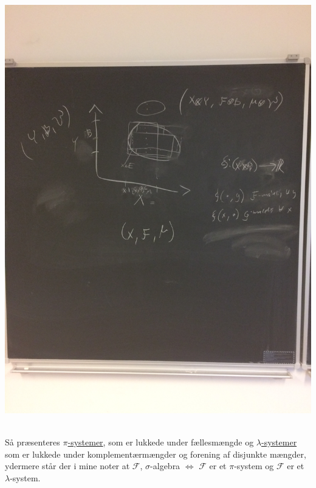 \documentclass[12pt]{report}
\theoremstyle{break}
\theoremstyle{break}
\newcommand{\FI}{\mathcal{F}}
\newcommand{\1}{\mathds{1}}
\begin{document}
\begin{minipage}[c]{\linewidth}
	\centering
	\includegraphics[scale=0.15,angle=270]{IMG_1}\label{fig:prodspace}
\end{minipage}\\[0.7 em]

Så præsenteres \href{https://en.wikipedia.org/wiki/Pi_system}{$\pi$-systemer}, som er lukkede under fællesmængde og \href{https://en.wikipedia.org/wiki/Dynkin_system}{$\lambda$-systemer} som er lukkede under komplementærmængder og forening af disjunkte mængder, ydermere står der i mine noter at $\FI$, $\sigma$-algebra $\iff$ $\FI$ er et $\pi$-system og $\FI$ er et $\lambda$-system. 
\end{document}

